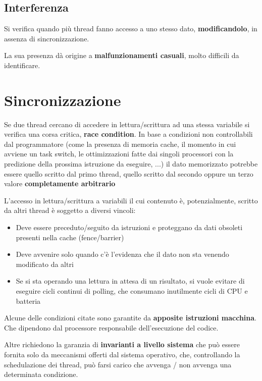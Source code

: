 \subsection{Interferenza}

Si verifica quando più thread
fanno accesso a uno stesso
dato, \textbf{modificandolo}, in assenza
di sincronizzazione.

La sua presenza dà origine a
\textbf{malfunzionamenti casuali},
molto difficili da identificare.

\section{Sincronizzazione}

Se due thread cercano di accedere in lettura/scrittura ad una stessa variabile
si verifica una corsa critica, \textbf{race condition}.
In base a condizioni non controllabili dal programmatore (come la presenza di memoria cache, il
momento in cui avviene un task switch, le ottimizzazioni fatte dai singoli processori con la predizione
della prossima istruzione da eseguire, ...) il dato memorizzato potrebbe essere quello scritto dal primo
thread, quello scritto dal secondo oppure un terzo valore \textbf{completamente arbitrario}


L'accesso in lettura/scrittura a variabili il cui contenuto è, potenzialmente,
scritto da altri thread è soggetto a diversi vincoli:

\begin{itemize}
  \item Deve essere preceduto/seguito da istruzioni e proteggano da dati obsoleti presenti nella cache
        (fence/barrier)
  \item Deve avvenire solo quando c'è l'evidenza che il dato non sta venendo modificato da altri
  \item Se si sta operando una lettura in attesa di un risultato, si vuole evitare di eseguire cicli continui di
        polling, che consumano inutilmente cicli di CPU e batteria
\end{itemize}


Alcune delle condizioni citate sono garantite da \textbf{apposite istruzioni macchina}.
Che dipendono dal processore responsabile dell'esecuzione del codice.


Altre richiedono la garanzia di \textbf{invarianti a livello sistema} che può essere
fornita solo da meccanismi offerti dal sistema operativo, che, controllando la
schedulazione dei thread, può farsi carico che avvenga / non avvenga una
determinata condizione.

